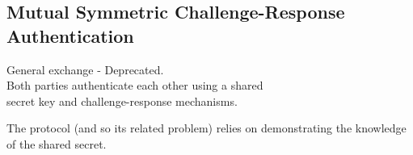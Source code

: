 \subsection{Mutual Symmetric Challenge-Response Authentication} 
\begin{center}
    General exchange - Deprecated.\\
    Both parties authenticate each other using a shared \\secret key and challenge-response mechanisms.\\ 
\end{center}
\begin{tcolorbox}[colback=red!10!white, colframe=red!70!black, coltitle=white, title=Beware]
The protocol (and so its related problem) relies on demonstrating the knowledge of the shared secret.
\end{tcolorbox}

